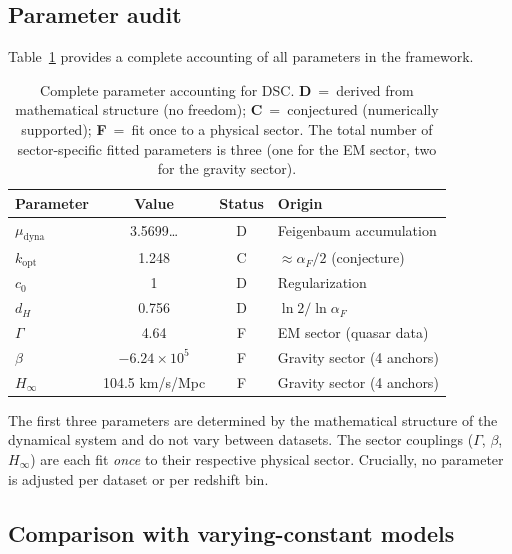 \documentclass[twocolumn,showpacs,preprintnumbers,amsmath,amssymb,prd]{revtex4-2}
\newcommand{\Hinf}{H_{\infty}}
\begin{document}
\subsection{Parameter audit}
\label{sec:params}

Table~\ref{tab:params} provides a complete accounting of all
parameters in the framework.

\begin{table}[h]
\caption{Complete parameter accounting for DSC.
\textbf{D}~=~derived from mathematical structure (no freedom);
\textbf{C}~=~conjectured (numerically supported);
\textbf{F}~=~fit once to a physical sector.
The total number of sector-specific fitted parameters is three
(one for the EM sector, two for the gravity sector).}
\label{tab:params}
\begin{ruledtabular}
\begin{tabular}{lccl}
 Parameter & Value & Status & Origin \\
\hline
$\mu_{\mathrm{dyna}}$ & 3.5699\ldots & D & Feigenbaum accumulation \\
$k_{\mathrm{opt}}$ & 1.248 & C & $\approx\alpha_F/2$ (conjecture) \\
$c_0$ & 1 & D & Regularization \\
$d_H$ & 0.756 & D & $\ln 2/\ln\alpha_F$ \\
$\Gamma$ & 4.64 & F & EM sector (quasar data) \\
$\beta$ & $-6.24\times10^5$ & F & Gravity sector (4 anchors) \\
$\Hinf$ & 104.5 km/s/Mpc & F & Gravity sector (4 anchors) \\
\end{tabular}
\end{ruledtabular}
\end{table}

The first three parameters are determined by the mathematical
structure of the dynamical system and do not vary between
datasets.
The sector couplings ($\Gamma$, $\beta$, $\Hinf$) are each fit
\emph{once} to their respective physical sector.
Crucially, no parameter is adjusted per dataset or per redshift
bin.

\subsection{Comparison with varying-constant models}
\label{sec:comparison}
\end{document}
